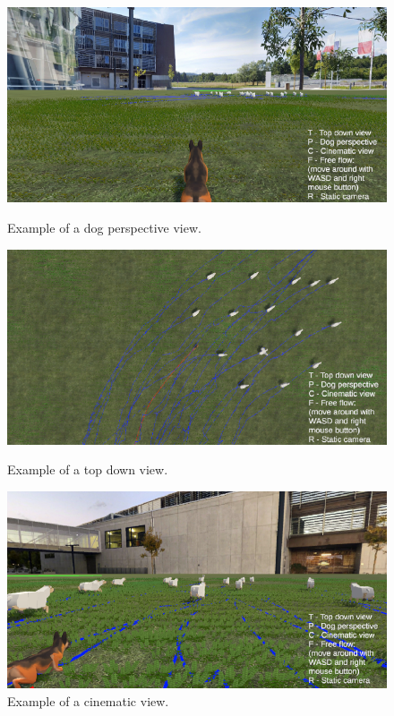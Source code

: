 \documentclass[9pt]{pnas-new}
\begin{document}
\begin{figure}[htbp]
    \centering
    \begin{minipage}{0.3\textwidth}
        \centering
        \includegraphics[width=\textwidth]{fig/dogp.PNG}
        \caption{Example of a dog perspective view.}
    \end{minipage}%
    \hspace{0.02\textwidth}  %
    \begin{minipage}{0.3\textwidth}
        \centering
        \includegraphics[width=\textwidth]{fig/topdown.PNG}
        \caption{Example of a top down view.}
    \end{minipage}%
    \hspace{0.02\textwidth}  %
    \begin{minipage}{0.3\textwidth}
        \centering
        \includegraphics[width=\textwidth]{fig/cinematic.PNG}
        \caption{Example of a cinematic view.}
    \end{minipage}
    

\end{figure}
\end{document}
